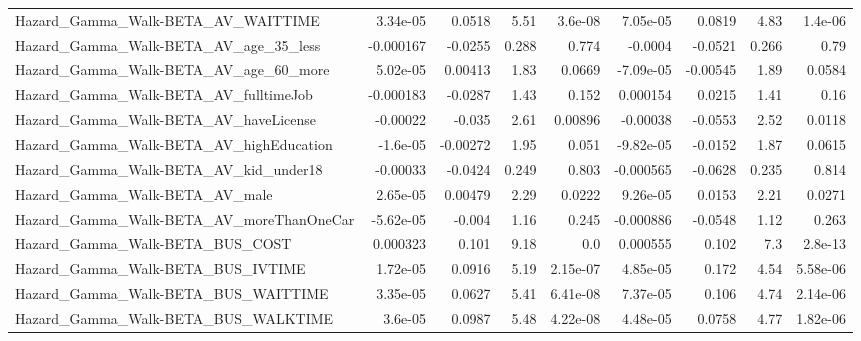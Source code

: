 \begin{tabular}{lrrrrrrrr}
Hazard\_Gamma\_Walk-BETA\_AV\_WAITTIME                 &    3.34e-05 &       0.0518 &     5.51 &  3.6e-08 &   7.05e-05 &      0.0819 &         4.83 &       1.4e-06 \\
Hazard\_Gamma\_Walk-BETA\_AV\_age\_35\_less              &   -0.000167 &      -0.0255 &    0.288 &    0.774 &    -0.0004 &     -0.0521 &        0.266 &          0.79 \\
Hazard\_Gamma\_Walk-BETA\_AV\_age\_60\_more              &    5.02e-05 &      0.00413 &     1.83 &   0.0669 &  -7.09e-05 &    -0.00545 &         1.89 &        0.0584 \\
Hazard\_Gamma\_Walk-BETA\_AV\_fulltimeJob              &   -0.000183 &      -0.0287 &     1.43 &    0.152 &   0.000154 &      0.0215 &         1.41 &          0.16 \\
Hazard\_Gamma\_Walk-BETA\_AV\_haveLicense              &    -0.00022 &       -0.035 &     2.61 &  0.00896 &   -0.00038 &     -0.0553 &         2.52 &        0.0118 \\
Hazard\_Gamma\_Walk-BETA\_AV\_highEducation            &    -1.6e-05 &     -0.00272 &     1.95 &    0.051 &  -9.82e-05 &     -0.0152 &         1.87 &        0.0615 \\
Hazard\_Gamma\_Walk-BETA\_AV\_kid\_under18              &    -0.00033 &      -0.0424 &    0.249 &    0.803 &  -0.000565 &     -0.0628 &        0.235 &         0.814 \\
Hazard\_Gamma\_Walk-BETA\_AV\_male                     &    2.65e-05 &      0.00479 &     2.29 &   0.0222 &   9.26e-05 &      0.0153 &         2.21 &        0.0271 \\
Hazard\_Gamma\_Walk-BETA\_AV\_moreThanOneCar           &   -5.62e-05 &       -0.004 &     1.16 &    0.245 &  -0.000886 &     -0.0548 &         1.12 &         0.263 \\
Hazard\_Gamma\_Walk-BETA\_BUS\_COST                    &    0.000323 &        0.101 &     9.18 &      0.0 &   0.000555 &       0.102 &          7.3 &       2.8e-13 \\
Hazard\_Gamma\_Walk-BETA\_BUS\_IVTIME                  &    1.72e-05 &       0.0916 &     5.19 & 2.15e-07 &   4.85e-05 &       0.172 &         4.54 &      5.58e-06 \\
Hazard\_Gamma\_Walk-BETA\_BUS\_WAITTIME                &    3.35e-05 &       0.0627 &     5.41 & 6.41e-08 &   7.37e-05 &       0.106 &         4.74 &      2.14e-06 \\
Hazard\_Gamma\_Walk-BETA\_BUS\_WALKTIME                &     3.6e-05 &       0.0987 &     5.48 & 4.22e-08 &   4.48e-05 &      0.0758 &         4.77 &      1.82e-06 \\

\end{tabular}
